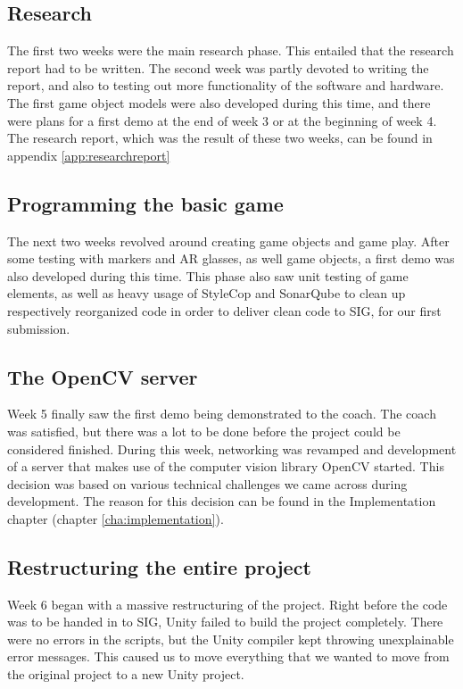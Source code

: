 		\subsection{Research} \label{ssec:research}
			The first two weeks were the main research phase. This entailed that the
			research report had to be written. The second week was partly devoted
			to writing the report, and also to testing out more functionality of
			the software and hardware. The first game object models were also
			developed during this time, and there were plans for a first demo at the end
			of week 3 or at the beginning of week 4. The research report, which was the 
			result of these two weeks, can be found in appendix \ref{app:researchreport}
		
		\subsection{Programming the basic game} \label{ssec:basics}
			The next two weeks revolved around creating game objects and game play.
			After some testing with markers and AR glasses, as well game objects, a 
			first demo was also developed during this time. This phase also saw unit testing of game
			elements, as well as heavy usage of StyleCop and SonarQube to clean up
			respectively reorganized code in order to deliver clean code to SIG, for our first
			submission.  
		
		\subsection{The OpenCV server} \label{ssec:firstdemo}
			Week 5 finally saw the first demo being demonstrated to the coach. The
			coach was satisfied, but there was a lot to be done before the project
			could be considered finished. During this week, networking was revamped
			and development of a server that makes use of the computer vision library
			OpenCV started. This decision was based on various technical challenges we 
			came across during development. The reason for this decision can be found 
			in the Implementation chapter (chapter \ref{cha:implementation}).
		
		\subsection{Restructuring the entire project}
			Week 6 began with a massive restructuring of the project. Right before
			the code was to be handed in to SIG, Unity failed to build the project
			completely. There were no errors in the scripts, but the Unity compiler
			kept throwing unexplainable error messages. This caused us to move 
			everything that we wanted to move from the original project to a new
			Unity project.
			
